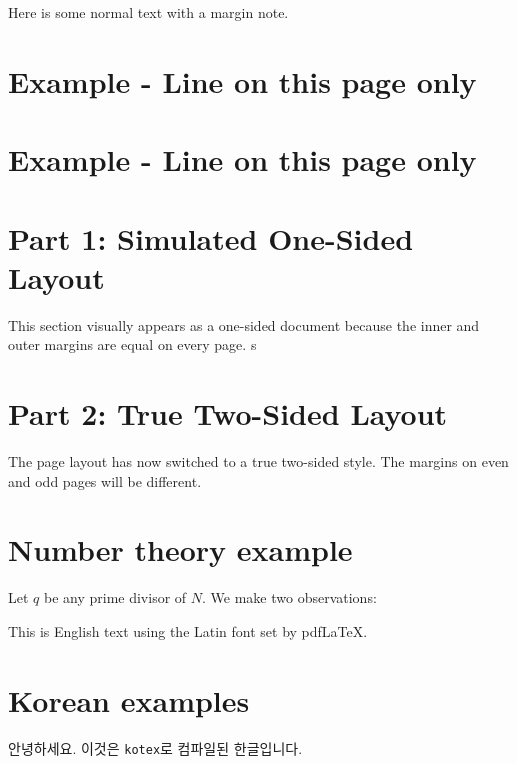 \documentclass[12pt]{book}
\begin{document}
  Here is some normal text with a margin note.






  \newpage
  \section*{Example - Line on this page only}
  \lipsum[1-2]



  \newpage
  \section*{Example - Line on this page only}
  \lipsum[1-2]






  \onesidedpaper %
  \section*{Part 1: Simulated One-Sided Layout}
  This section visually appears as a one-sided document because the inner and 
  outer margins are equal on every page. s
  \lipsum[1-2]

  \newpage
  \section*{Part 2: True Two-Sided Layout}
  The page layout has now switched to a true two-sided style. The margins on even and odd pages will be different.
  \lipsum[3-4]





    
  \section{Number theory example}
  Let $q$ be any prime divisor of \(N\). We make two observations:

  This is English text using the Latin font set by pdfLaTeX.

  \section{Korean examples}
  안녕하세요. 이것은 \texttt{kotex}로 컴파일된 한글입니다.
\end{document}
